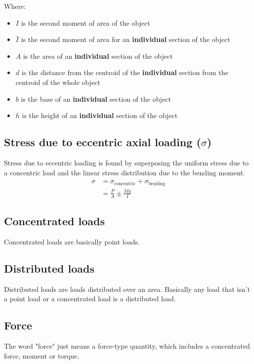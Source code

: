 \documentclass[11pt]{article}
\begin{document}
Where:
\begin{itemize}
\item \(I\) is the second moment of area of the object
\item \(\bar{I}\) is the second moment of area for an \textbf{individual} section of the object
\item \(A\) is the area of an \textbf{individual} section of the object
\item \(d\) is the distance from the centroid of the \textbf{individual} section from the centroid of the whole object
\item \(b\) is the base of an \textbf{individual} section of the object
\item \(h\) is the height of an \textbf{individual} section of the object
\end{itemize}

\subsection{Stress due to eccentric axial loading (\(\sigma\))}
\label{sec:org0cc8f3b}
Stress due to eccentric loading is found by superposing the uniform stress due to a concentric load and the linear stress distribution due to the bending moment.
\begin{align*}
\sigma &= \sigma_{\text{concentric}} + \sigma_{\text{bending}} \\
&= \frac{P}{A} \pm \frac{My}{I}
\end{align*}

\subsection{Concentrated loads}
\label{sec:orgfdd04c7}
Concentrated loads are basically point loads.

\subsection{Distributed loads}
\label{sec:orgb3b44b9}
Distributed loads are loads distributed over an area. Basically any load that isn't a point load or a concentrated load is a distributed load.

\subsection{Force}
\label{sec:org054c67b}
The word "force" just means a force-type quantity, which includes a concentrated force, moment or torque.
\end{document}
